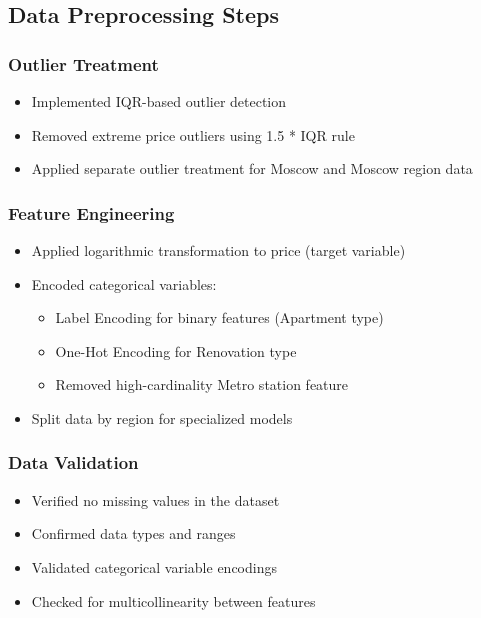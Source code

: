 \documentclass[12pt,a4paper]{report}
\begin{document}
\subsection{Data Preprocessing Steps}
\subsubsection{Outlier Treatment}
\begin{itemize}
    \item Implemented IQR-based outlier detection
    \item Removed extreme price outliers using 1.5 * IQR rule
    \item Applied separate outlier treatment for Moscow and Moscow region data
\end{itemize}

\subsubsection{Feature Engineering}
\begin{itemize}
    \item Applied logarithmic transformation to price (target variable)
    \item Encoded categorical variables:
    \begin{itemize}
        \item Label Encoding for binary features (Apartment type)
        \item One-Hot Encoding for Renovation type
        \item Removed high-cardinality Metro station feature
    \end{itemize}
    \item Split data by region for specialized models
\end{itemize}

\subsubsection{Data Validation}
\begin{itemize}
    \item Verified no missing values in the dataset
    \item Confirmed data types and ranges
    \item Validated categorical variable encodings
    \item Checked for multicollinearity between features
\end{itemize}
\end{document}

